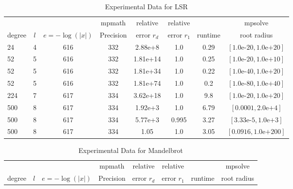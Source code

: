 \documentclass[sigconf]{acmart}
\begin{document}
\begin{table}[t]
\caption{Experimental Data for LSR} %
\label{tab:lsr}
\vskip -0.15in
\begin{center}
\begin{small}
\begin{sc}
\begin{tabular}{lccccccc}
\toprule
&  &  & mpmath & relative  & relative &  & mpsolve \\
degree  & $l$& $e=-\log(|x|)$& Precision &error $r_d$       & error $r_1$ &runtime& root radius\\
\midrule
 24 & 4 & 616 & 332 & 2.88e+8 & 1.0 & 0.29 & $[1.0\text{e-}20, 1.0\text{e+}20]$\\
 52 & 5 & 616 & 332 & 1.81e+14 & 1.0 & 0.25 & $[1.0\text{e-}20, 1.0\text{e+}10]$\\ %
 52 & 5 & 616 & 332 & 1.81e+34 & 1.0 & 0.22 & $[1.0\text{e-}40, 1.0\text{e+}20]$\\ %
 52 & 5 & 616 & 332 & 1.81e+74 & 1.0 & 0.2 & $[1.0\text{e-}80, 1.0\text{e+}40]$\\ %
 224 & 7 & 617 & 334 & 3.62e+18 & 1.0 & 9.8 & $[1.0\text{e-}20, 1.0\text{e+}20]$\\
 500 & 8 & 617 & 334 & 1.92e+3 & 1.0 & 6.79 & $[0.0001, 2.0\text{e+}4]$\\
 500 & 8 & 617 & 334 & 5.77e+3 & 0.995 & 3.27 & $[3.33\text{e-}5, 1.0\text{e+}3]$\\
 500 & 8 & 617 & 334 & 1.05 & 1.0 & 3.05 & $[0.0916, 1.0\text{e+}200]$\\
\bottomrule
\end{tabular}
\end{sc}
\end{small}
\end{center}
\vskip 0.05in
\end{table}


\begin{table}[t]
\caption{Experimental Data for Mandelbrot}
\label{tab:mand}
\vskip -0.15in
\begin{center}
\begin{small}
\begin{sc}
\begin{tabular}{lccccccc}
\toprule
&  &  & mpmath & relative  & relative &  & mpsolve \\
degree  & $l$& $e=-\log(|x|)$& Precision &error $r_d$       & error $r_1$ &runtime& root radius\\
\midrule

\bottomrule
\end{tabular}
\end{sc}
\end{small}
\end{center}
\vskip 0.05in
\end{table}
\end{document}
